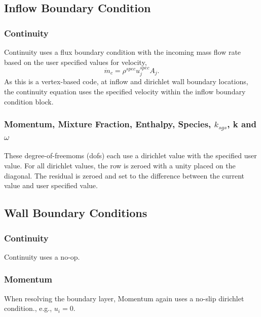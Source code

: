 \subsection{Inflow Boundary Condition}

\subsubsection{Continuity}
Continuity uses a flux boundary condition with the incoming
mass flow rate based on the user specified values for velocity,
\begin{equation}
  \dot{m}_c = \rho^{spec} u^{spec}_j A_j.
\end{equation}
As this is a vertex-based code, at inflow and dirichlet wall boundary locations,
the continuity equation uses the specified velocity within the inflow boundary condition
block.

\subsubsection{Momentum, Mixture Fraction, Enthalpy, Species, $k_{sgs}$, k and $\omega$}
These degree-of-freemoms (dofs) each use a dirichlet value with the specified user value.
For all dirichlet values, the row is zeroed with a unity placed
on the diagonal. The residual is zeroed and set to the difference
between the current value and user specified value.

\subsection{Wall Boundary Conditions}

\subsubsection{Continuity}
Continuity uses a no-op.

\subsubsection{Momentum}
When resolving the boundary layer, Momentum again uses a no-slip 
dirichlet condition., e.g., $u_i = 0$. 

